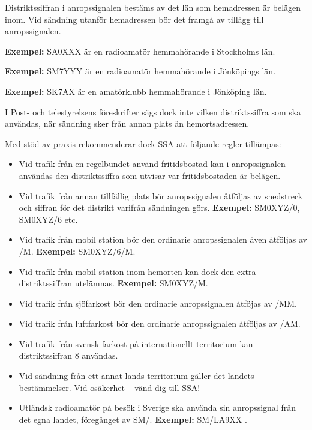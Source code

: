 Distriktssiffran i anropssignalen bestäms av det län som hemadressen är belägen inom.
Vid sändning utanför hemadressen bör det framgå av tillägg till anropssignalen.

\textbf{Exempel:} SA0XXX är en radioamatör hemmahörande i Stockholms län.

\textbf{Exempel:} SM7YYY är en radioamatör hemmahörande i Jönköpings län.

\textbf{Exempel:} SK7AX är en amatörklubb hemmahörande i Jönköping län.

I Post- och telestyrelsens föreskrifter sägs dock inte vilken distriktssiffra
som ska användas, när sändning sker från annan plats än hemortsadressen.

Med stöd av praxis rekommenderar dock SSA att följande regler tillämpas:

\begin{itemize}
\item Vid trafik från en regelbundet använd fritidsbostad kan i
  anropssignalen användas den distriktssiffra som utvisar var
  fritidsbostaden är belägen.

\item Vid trafik från annan tillfällig plats bör anropssignalen
  åtföljas av snedstreck och siffran för det distrikt varifrån
  sändningen görs.
  \textbf{Exempel:} SM0XYZ/0, SM0XYZ/6 etc.

\item Vid trafik från mobil station bör den ordinarie anropssignalen
  även åtföljas av /M.
  \textbf{Exempel:} SM0XYZ/6/M.

\item Vid trafik från mobil station inom hemorten kan dock den extra
  distriktssiffran utelämnas.
  \textbf{Exempel:} SM0XYZ/M.

\item Vid trafik från sjöfarkost bör den ordinarie anropssignalen
 åtföjas av /MM.

\item Vid trafik från luftfarkost bör den ordinarie anropssignalen
  åtföljas av /AM.

\item Vid trafik från svensk farkost på internationellt territorium
 kan distriktssiffran 8 användas.

\item Vid sändning från ett annat lands territorium gäller det landets
  bestämmelser.
  Vid osäkerhet -- vänd dig till SSA!

\item Utländsk radioamatör på besök i Sverige ska använda sin
  anropssignal från det egna landet, föregånget av SM/. \textbf{Exempel:} SM/LA9XX \cite{TR6101}.
\end{itemize}

